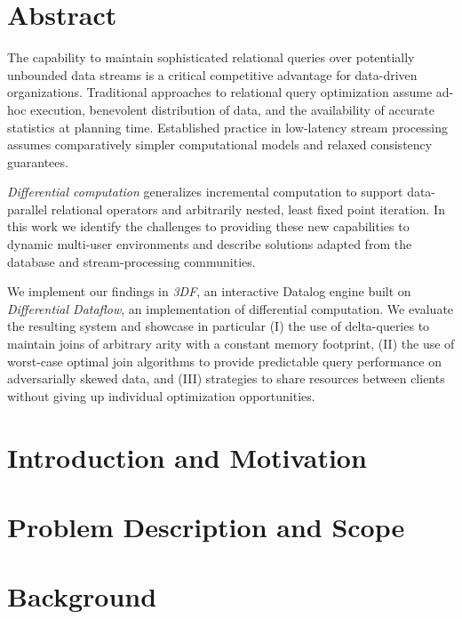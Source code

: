 \documentclass{article}
\begin{document}
\tableofcontents

\newpage

\section{Abstract} \label{abstract}

The capability to maintain sophisticated relational queries over
potentially unbounded data streams is a critical competitive advantage
for data-driven organizations. Traditional approaches to relational
query optimization assume ad-hoc execution, benevolent distribution of
data, and the availability of accurate statistics at planning
time. Established practice in low-latency stream processing assumes
comparatively simpler computational models and relaxed consistency
guarantees.

\emph{Differential computation} generalizes incremental computation to
support data-parallel relational operators and arbitrarily nested,
least fixed point iteration. In this work we identify the challenges
to providing these new capabilities to dynamic multi-user environments
and describe solutions adapted from the database and stream-processing
communities.

We implement our findings in \emph{3DF}, an interactive Datalog engine
built on \emph{Differential Dataflow}, an implementation of
differential computation. We evaluate the resulting system and
showcase in particular (I) the use of delta-queries to maintain joins
of arbitrary arity with a constant memory footprint, (II) the use of
worst-case optimal join algorithms to provide predictable query
performance on adversarially skewed data, and (III) strategies to
share resources between clients without giving up individual
optimization opportunities.

\newpage

\section{Introduction and Motivation} \label{intro}

\newpage

\section{Problem Description and Scope} \label{problem}

\newpage

\section{Background} \label{background}

\newpage
\end{document}
